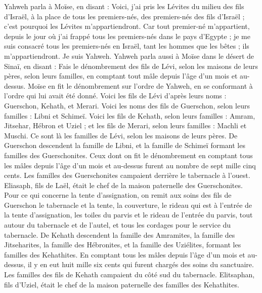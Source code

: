 \begin{multicols}{2}
Yahweh parla à Moïse, en disant :
Voici, j'ai pris les Lévites du milieu des fils d'Israël, à la place de tous les premiers-nés, des premiers-nés des fils d'Israël ; c'est pourquoi les Lévites m’appartiendront.
Car tout premier-né m'appartient, depuis le jour où j’ai frappé tous les premiers-nés dans le pays d'Egypte ; je me suis consacré tous les premiers-nés en Israël, tant les hommes que les bêtes ; ils m’appartiendront. Je suis Yahweh.
Yahweh parla aussi à Moïse dans le désert de Sinaï, en disant :
Fais le dénombrement des fils de Lévi, selon les maisons de leurs pères, selon leurs familles, en comptant tout mâle depuis l'âge d'un mois et au-dessus.
Moïse en fit le dénombrement sur l’ordre de Yahweh, en se conformant à l’ordre qui lui avait été donné.
Voici les fils de Lévi d’après leurs noms : Guerschon, Kehath, et Merari.
Voici les noms des fils de Guerschon, selon leurs familles : Libni et Schimeï.
Voici les fils de Kehath, selon leurs familles : Amram, Jitsehar, Hébron et Uziel ;
et les fils de Merari, selon leurs familles : Machli et Muschi. Ce sont là les familles de Lévi, selon les maisons de leurs pères.
De Guerschon descendent la famille de Libni, et la famille de Schimeï formant les familles des Guerschonites.
Ceux dont on fit le dénombrement en comptant tous les mâles depuis l'âge d'un mois et au-dessus furent au nombre de sept mille cinq cents.
Les familles des Guerschonites campaient derrière le tabernacle à l'ouest.
Eliasaph, fils de Laël, était le chef de la maison paternelle des Guerschonites.
Pour ce qui concerne la tente d’assignation, on remit aux soins des fils de Guerschon le tabernacle et la tente, la couverture, le rideau qui est à l'entrée de la tente d'assignation,
les toiles du parvis et le rideau de l'entrée du parvis, tout autour du tabernacle et de l'autel, et tous les cordages pour le service du tabernacle.
De Kehath descendent la famille des Amramites, la famille des Jitseharites, la famille des Hébronites, et la famille des Uziélites, formant les familles des Kehathites.
En comptant tous les mâles depuis l'âge d'un mois et au-dessus, il y en eut huit mille six cents qui furent chargés des soins du sanctuaire.
Les familles des fils de Kehath campaient du côté sud du tabernacle.
Elitsaphan, fils d’Uziel, était le chef de la maison paternelle des familles des Kehathites.

\end{multicols}
